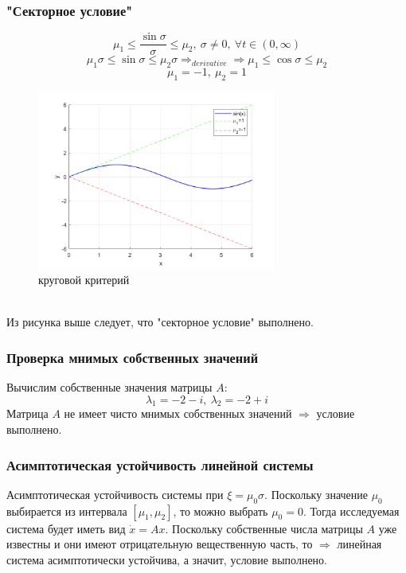 \documentclass[12pt]{article}
\begin{document}
\subsubsection*{"Секторное условие"}
\[
\mu_1 \leq \frac{\sin{\sigma}}{\sigma} \leq \mu_2, \ \sigma \neq 0, \ \forall t \in (0, \infty)
\]
\[
\mu_1 \sigma \leq \sin{\sigma} \leq \mu_2 \sigma \Rightarrow_{derivative}\Rightarrow \mu_1 \leq \cos{\sigma} \leq \mu_2
\]
\[
\mu_1 = -1, \ \mu_2 = 1
\]
\begin{figure}[h]
    \centering
    \includegraphics[width=0.7\textwidth]{sector_criterion_2}
    \caption{круговой критерий}
    \label{fig:sector_criterion_2}
\end{figure} \\
Из рисунка выше следует, что "секторное условие" выполнено.
\subsubsection*{Проверка мнимых собственных значений}
Вычислим собственные значения матрицы $A$:
\[
\lambda_1 = -2 - i, \ \lambda_2 = -2 + i
\]
Матрица $A$ не имеет чисто мнимых собственных значений $\Rightarrow$ условие выполнено.
\subsubsection*{Асимптотическая устойчивость линейной системы}
Асимптотическая устойчивость системы при $\xi = \mu_0 \sigma$.
Поскольку значение $\mu_0$ выбирается из интервала $[\mu_1, \mu_2]$, то можно
выбрать $\mu_0=0$. Тогда исследуемая система будет иметь вид $\dot{x} = Ax$. Поскольку собственные числа матрицы $A$ уже известны и они имеют отрицательную вещественную часть, то $\Rightarrow$ линейная система асимптотически устойчива, а значит, условие выполнено.
\end{document}
